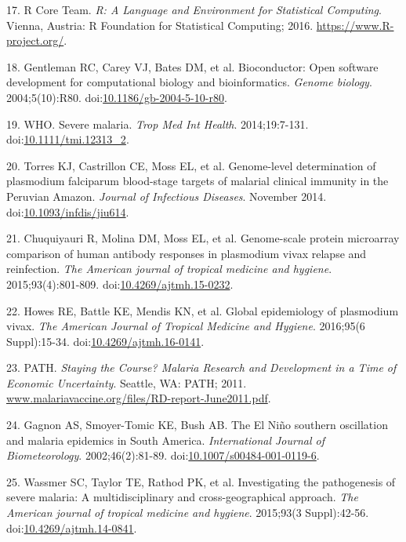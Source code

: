 \documentclass[a4paper]{article}
\begin{document}
\hypertarget{ref-R2016}{}
17. R Core Team. \emph{R: A Language and Environment for Statistical
Computing}. Vienna, Austria: R Foundation for Statistical Computing;
2016. \url{https://www.R-project.org/}.

\hypertarget{ref-bioconductor2004}{}
18. Gentleman RC, Carey VJ, Bates DM, et al. Bioconductor: Open software
development for computational biology and bioinformatics. \emph{Genome
biology}. 2004;5(10):R80.
doi:\href{https://doi.org/10.1186/gb-2004-5-10-r80}{10.1186/gb-2004-5-10-r80}.

\hypertarget{ref-WHO2014severe}{}
19. WHO. Severe malaria. \emph{Trop Med Int Health}. 2014;19:7-131.
doi:\href{https://doi.org/10.1111/tmi.12313_2}{10.1111/tmi.12313\_2}.

\hypertarget{ref-Torres2014asymptomatic}{}
20. Torres KJ, Castrillon CE, Moss EL, et al. Genome-level determination
of plasmodium falciparum blood-stage targets of malarial clinical
immunity in the Peruvian Amazon. \emph{Journal of Infectious Diseases}.
November 2014.
doi:\href{https://doi.org/10.1093/infdis/jiu614}{10.1093/infdis/jiu614}.

\hypertarget{ref-chuquiyauri2015vivax}{}
21. Chuquiyauri R, Molina DM, Moss EL, et al. Genome-scale protein
microarray comparison of human antibody responses in plasmodium vivax
relapse and reinfection. \emph{The American journal of tropical medicine
and hygiene}. 2015;93(4):801-809.
doi:\href{https://doi.org/10.4269/ajtmh.15-0232}{10.4269/ajtmh.15-0232}.

\hypertarget{ref-howes2016global}{}
22. Howes RE, Battle KE, Mendis KN, et al. Global epidemiology of
plasmodium vivax. \emph{The American Journal of Tropical Medicine and
Hygiene}. 2016;95(6 Suppl):15-34.
doi:\href{https://doi.org/10.4269/ajtmh.16-0141}{10.4269/ajtmh.16-0141}.

\hypertarget{ref-path2011}{}
23. PATH. \emph{Staying the Course? Malaria Research and Development in
a Time of Economic Uncertainty}. Seattle, WA: PATH; 2011.
\url{www.malariavaccine.org/files/RD-report-June2011.pdf}.

\hypertarget{ref-gagnon2002enso}{}
24. Gagnon AS, Smoyer-Tomic KE, Bush AB. The El Niño southern
oscillation and malaria epidemics in South America. \emph{International
Journal of Biometeorology}. 2002;46(2):81-89.
doi:\href{https://doi.org/10.1007/s00484-001-0119-6}{10.1007/s00484-001-0119-6}.

\hypertarget{ref-wassmer2015}{}
25. Wassmer SC, Taylor TE, Rathod PK, et al. Investigating the
pathogenesis of severe malaria: A multidisciplinary and
cross-geographical approach. \emph{The American journal of tropical
medicine and hygiene}. 2015;93(3 Suppl):42-56.
doi:\href{https://doi.org/10.4269/ajtmh.14-0841}{10.4269/ajtmh.14-0841}.
\end{document}
